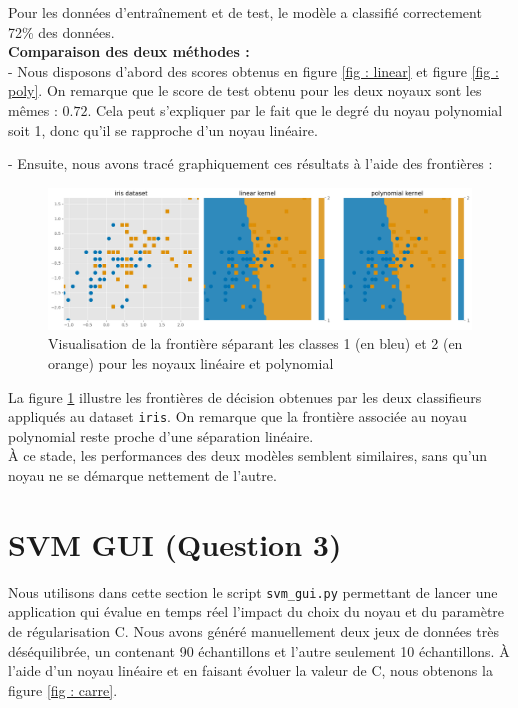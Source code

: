\documentclass[a4paper,12pt]{article}
\begin{document}
Pour les données d'entraînement et de test, le modèle a classifié correctement 72\% des données. \\

\textbf{Comparaison des deux méthodes  : }\\[0.5cm]
- Nous disposons d'abord des scores obtenus en figure \ref{fig : linear} et figure \ref{fig : poly}.
On remarque que le score de test obtenu pour les deux noyaux sont les mêmes : $0.72$.
Cela peut s'expliquer par le fait que le degré du noyau polynomial soit 1, donc qu'il se rapproche d'un noyau linéaire.

- Ensuite, nous avons tracé graphiquement ces résultats à l'aide des frontières : \\
\begin{figure}[H]
    \centering
    \includegraphics[width=\textwidth]{Images/linear_versus_poly.png}
    \caption{Visualisation de la frontière séparant les classes 1 (en bleu) et 2 (en orange) pour les noyaux linéaire et polynomial}\label{fig : compare}
\end{figure}

La figure \ref{fig : compare} illustre les frontières de décision obtenues par les deux classifieurs appliqués au dataset \texttt{iris}.  
On remarque que la frontière associée au noyau polynomial reste proche d’une séparation linéaire. \\
À ce stade, les performances des deux modèles semblent similaires, sans qu’un noyau ne se démarque nettement de l’autre.

\newpage

\section{SVM GUI (Question 3)} 

Nous utilisons dans cette section le script \texttt{svm\_gui.py}  permettant de lancer une application qui évalue en temps réel l’impact du choix du noyau et du paramètre de régularisation C.
Nous avons généré manuellement deux jeux de données très déséquilibrée, un contenant 90 échantillons et l'autre seulement 10 échantillons. 
À l'aide d'un noyau linéaire et en faisant évoluer la valeur de C, nous obtenons la figure \ref{fig : carre}.
\end{document}
